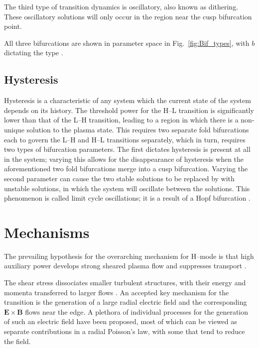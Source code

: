 The third type of transition dynamics is oscillatory, also known as dithering.
These oscillatory solutions will only occur in the region near the cusp bifurcation point.

All three bifurcations are shown in parameter space in Fig.~\ref{fig:Bif_types}, with $b$ dictating the type \cite{weymiens_bifurcation_2014}.

\subsection{Hysteresis}
Hysteresis is a characteristic of any system which the current state of the system depends on its history.
The threshold power for the H--L transition is significantly lower than that of the L--H transition, leading to a region in which there is a non-unique solution to the plasma state.
This requires two separate fold bifurcations each to govern the L--H and H--L transitions separately, which in turn, requires two types of bifurcation parameters.
The first dictates hysteresis is present at all in the system; varying this allows for the disappearance of hysteresis when the aforementioned two fold bifurcations merge into a cusp bifurcation.
Varying the second parameter can cause the two stable solutions to be replaced by with unstable solutions, in which the system will oscillate between the solutions.
This phenomenon is called limit cycle oscillations; it is a result of a Hopf bifurcation \cite{weymiens_bifurcation_2014}.

\section{Mechanisms}
The prevailing hypothesis for the overarching mechanism for H--mode is that high auxiliary power develops strong sheared plasma flow and suppresses transport \cite{freidberg_plasma_2007}.

The shear stress dissociates smaller turbulent structures, with their energy and momenta transferred to larger flows \cite{staps_backstepping_2017}.
An accepted key mechanism for the transition is the generation of a large radial electric field and the corresponding $\mathbf{E}\times\mathbf{B}$ flows near the edge.
A plethora of individual processes for the generation of such an electric field have been proposed, most of which can be viewed as separate contributions in a radial Poisson's law, with some that tend to reduce the field.

